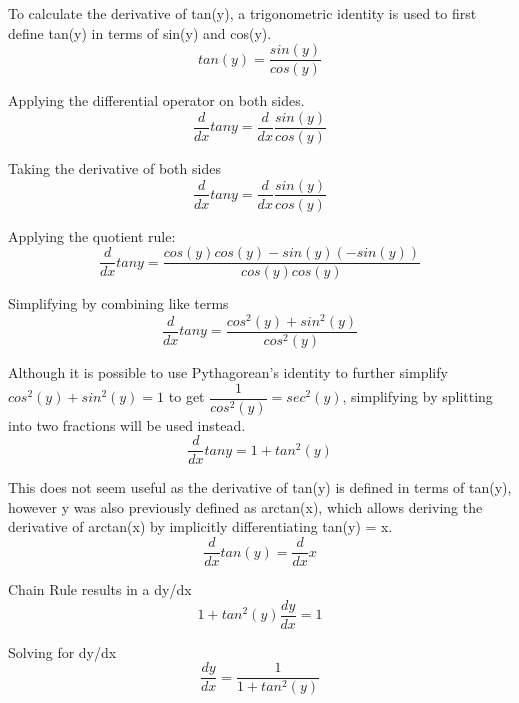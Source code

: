 \documentclass[12pt, titlepage]{article}
\begin{document}
To calculate the derivative of tan(y), a trigonometric identity is used to first define tan(y) in terms of sin(y) and cos(y).
\begin{equation*}
 tan(y) = \frac{sin(y)}{cos(y)}
\end{equation*}

Applying the differential operator on both sides.
\begin{equation*}
  \frac{d}{dx} tany = \frac{d}{dx} \frac{sin(y)}{cos(y)}
\end{equation*}

Taking the derivative of both sides
\begin{equation*}
  \frac{d}{dx} tany = \frac{d}{dx} \frac{sin(y)}{cos(y)}
\end{equation*}

Applying the quotient rule:
\begin{equation*}
  \frac{d}{dx} tany = \frac{cos(y)cos(y) - sin(y)(-sin(y))}{cos(y)cos(y)}
\end{equation*}

Simplifying by combining like terms
\begin{equation*}
  \frac{d}{dx} tany = \frac{cos^{2}(y) + sin^{2}(y)}{cos^{2}(y)}
\end{equation*}

Although it is possible to use Pythagorean's identity to further simplify \(cos^{2}(y) + sin^{2}(y) = 1\) to get \(\dfrac{1}{cos^{2}(y)} = sec^{2}(y)\), simplifying by splitting into two fractions will be used instead. 
\begin{equation*}
  \frac{d}{dx} tany = 1 + tan^{2}(y)
\end{equation*}

This does not seem useful as the derivative of tan(y) is defined in terms of tan(y), however y was also previously defined as arctan(x), which allows deriving the derivative of arctan(x) by implicitly differentiating tan(y) = x.
\begin{equation*}
 \frac{d}{dx} tan(y) = \frac{d}{dx} x
\end{equation*}

Chain Rule results in a dy/dx
\begin{equation*}
 1 + tan^{2}(y) \frac{dy}{dx}  = 1
\end{equation*}

Solving for dy/dx
\begin{equation*}
 \frac{dy}{dx}  = \frac{1}{1 + tan^{2}(y)}
\end{equation*}
\end{document}
